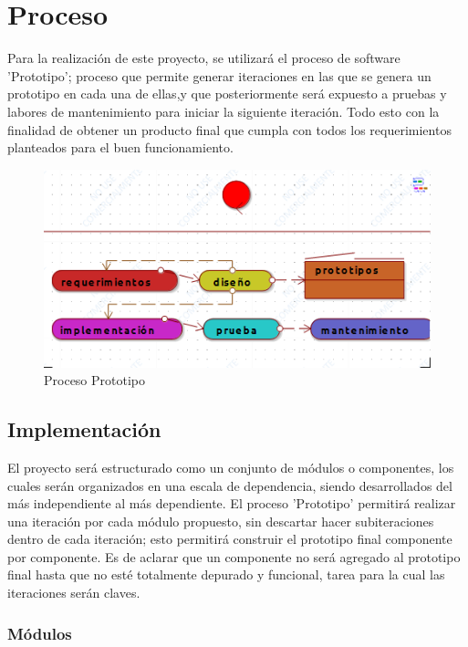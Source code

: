 \chapter{Proceso}

Para la realización de este proyecto, se utilizará el proceso de software 'Prototipo'; proceso que permite generar iteraciones en las que se genera un prototipo en cada una de ellas,y que posteriormente será expuesto a pruebas y labores de mantenimiento para iniciar la siguiente iteración. Todo esto con la finalidad de obtener un producto final que cumpla con todos los requerimientos planteados para el buen funcionamiento.

\begin{figure}[h!]
	\centering
	\includegraphics[width=0.7\linewidth]{proyecto/proceso/imgs/prototipo}
	\caption{Proceso Prototipo}
\end{figure}
\section{Implementación}

El proyecto será estructurado como un conjunto de módulos o componentes, los cuales serán organizados en una escala de dependencia, siendo desarrollados del más independiente al más dependiente. El proceso 'Prototipo' permitirá realizar una iteración por cada módulo propuesto, sin descartar hacer subiteraciones dentro de cada iteración; esto permitirá construir el prototipo final componente por componente. Es de aclarar que un componente no será agregado al prototipo final hasta que no esté totalmente depurado y funcional, tarea para la cual las iteraciones serán claves.


\subsection{Módulos}

